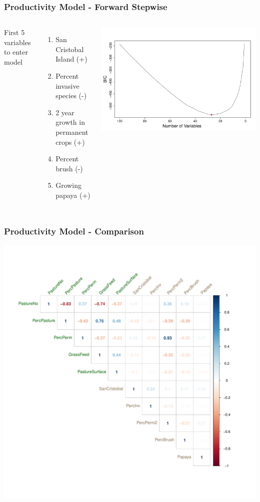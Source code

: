 \documentclass{beamer}
\begin{document}
\begin{frame}
\frametitle{Productivity Model - Forward Stepwise}
\begin{columns}

First 5 variables to enter model
\begin{enumerate}
	\item San Cristobal Island (+)
	\item Percent invasive species (-)
	\item 2 year growth in permanent crops (+)
	\item Percent brush (-)
	\item Growing papaya (+)
\end{enumerate}

\includegraphics[scale=0.2]{forward_nvars_production}

\end{columns}


\end{frame}

\begin{frame}
\frametitle{Productivity Model - Comparison}
\centering
\includegraphics[scale=0.4]{corplot}
\end{frame}
\end{document}
